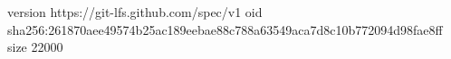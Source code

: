 version https://git-lfs.github.com/spec/v1
oid sha256:261870aee49574b25ac189eebae88c788a63549aca7d8c10b772094d98fae8ff
size 22000
